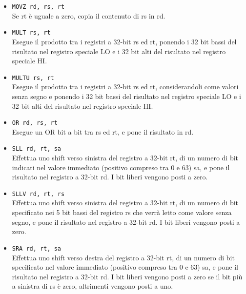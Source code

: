 \documentclass[12pt]{report}
\begin{document}
\begin{itemize}
	\item \texttt{MOVZ rd, rs, rt}\\
	Se rt \`{e} uguale a zero, copia il contenuto di rs in rd.

	\item \texttt{MULT rs, rt}\\
	Esegue il prodotto tra i registri a 32-bit rs ed rt, ponendo i 32 bit bassi del risultato nel registro speciale LO
	e i 32 bit alti del risultato nel registro speciale HI.

	\item \texttt{MULTU rs, rt}\\
	Esegue il prodotto tra i registri a 32-bit rs ed rt, considerandoli come valori senza segno e ponendo i 32 bit 
	bassi del risultato nel registro speciale LO e i 32 bit alti del risultato nel registro speciale HI.
	
	\item \texttt{OR rd, rs, rt}\\
	Esegue un OR bit a bit tra rs ed rt, e pone il risultato in rd.

	\item \texttt{SLL rd, rt, sa}\\
	Effettua uno shift verso sinistra del registro a 32-bit rt, di un numero di bit indicati nel valore immediato (positivo compreso tra 0 e 63) sa, 
	e pone il risultato nel registro a 32-bit rd. I bit liberi vengono posti a zero.

	\item \texttt{SLLV rd, rt, rs}\\
	Effettua uno shift verso sinistra del registro a 32-bit rt, di un numero di bit specificato nei 5 bit bassi del registro rs che verr\`{a} letto come valore senza segno, 
	e pone il risultato nel registro a 32-bit rd. I bit liberi vengono posti a zero.

	\item \texttt{SRA rd, rt, sa}\\
	Effettua uno shift verso destra del registro a 32-bit rt, di un numero di bit specificato nel valore immediato (positivo compreso tra 0 e 63) sa, 
	e pone il risultato nel registro a 32-bit rd.
	I bit liberi vengono posti a zero se il bit pi\`{u} a sinistra di rs \`{e} zero, altrimenti vengono posti a uno.


\end{itemize}
\end{document}
